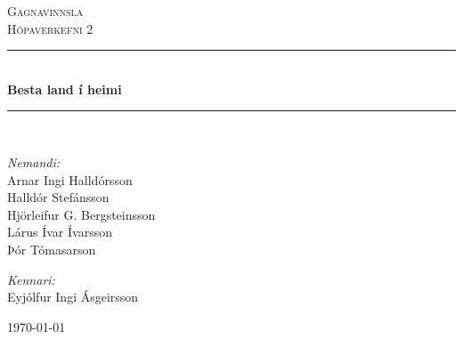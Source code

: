 \newcommand{\HRule}{\rule{\linewidth}{0.5mm}}

\begin{titlepage}

\begin{center}


\textsc{\LARGE Gagnavinnsla}\\[0.5cm]
\textsc{\Large Hópaverkefni 2}\\[0.6cm]

\HRule \\[0.4cm]
{ \Huge \bfseries Besta land í heimi}\\[0.2cm]

\HRule \\[1.5cm]


\begin{minipage}{0.49\textwidth}
\begin{flushleft} \large
\emph{Nemandi:}\\
Arnar Ingi Halldórsson\\
Halldór Stefánsson\\
Hjörleifur G. Bergsteinsson\\
Lárus Ívar Ívarsson\\
Þór Tómasarson
\end{flushleft}
\end{minipage}
\begin{minipage}{0.49\textwidth}
\begin{flushright} \large
\emph{Kennari:} \\
Eyjólfur Ingi Ásgeirsson
\end{flushright}
\end{minipage}

\vfill

{\large \today}



\end{center}

\end{titlepage}